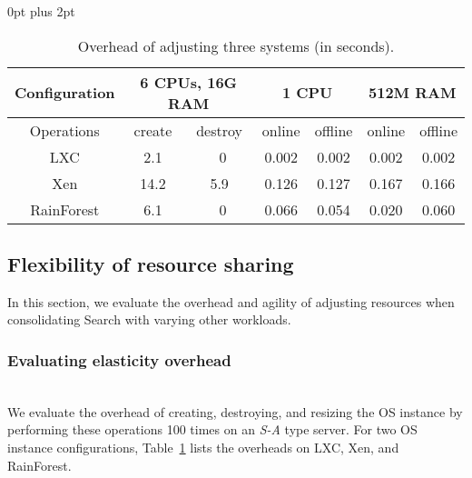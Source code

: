 \documentclass[pageno]{jpaper}
\begin{document}
\begin{table}[t]
\renewcommand{\arraystretch}{1.1}
\setlength{\abovecaptionskip}{3pt}
\setlength{\belowcaptionskip}{0pt}
\setlength{\textfloatsep} {0pt plus 2pt}
\setlength{\tabcolsep}{5pt}
\centering
\label{table_elastic_partition}
\caption{Overhead of adjusting three systems (in seconds).}
\label{table_elastic_partition}
\begin{lrbox}{\tablebox}
\begin{tabular}{|c|c|c|c|c|c|c|}
\hline
Configuration & \multicolumn{2}{c|}{6 CPUs, 16G RAM} & \multicolumn{2}{c|}{1 CPU} & \multicolumn{2}{c|}{512M RAM} \\ \hline
Operations & create & destroy & online & offline & online & offline \\ \hline
LXC & 2.1 & ~0 & 0.002 & 0.002 & 0.002 & 0.002 \\ \hline
Xen & 14.2 & 5.9 & 0.126 & 0.127 & 0.167 & 0.166 \\ \hline
RainForest & 6.1 & ~0 & 0.066 & 0.054 & 0.020 & 0.060 \\ \hline
\end{tabular}
\end{lrbox}
\scalebox{0.8}{\usebox{\tablebox}}
\end{table}



\subsection{Flexibility of resource sharing}
In this section, we evaluate the overhead and agility of adjusting resources when consolidating Search with varying other workloads.


\subsubsection{Evaluating elasticity overhead}
\textrm{\\} We evaluate the overhead of creating, destroying, and resizing the OS instance  by  performing these operations 100 times on an \emph{S-A} type server. For two OS instance configurations, Table~\ref{table_elastic_partition} lists the overheads on LXC, Xen, and RainForest.
\end{document}

